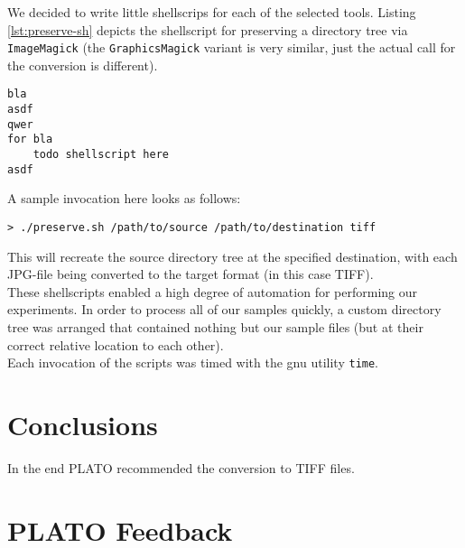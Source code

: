 We decided to write little shellscrips for each of the selected tools. Listing
\ref{lst:preserve-sh} depicts the shellscript for preserving a directory tree
via \texttt{ImageMagick} (the \texttt{GraphicsMagick} variant is very similar,
just the actual call for the conversion is different).

\begin{lstlisting}[caption=Shellscript for preserving a directory tree via
ImageMagick, label=lst:preserve-sh]
bla
asdf
qwer
for bla
    todo shellscript here
asdf
\end{lstlisting}

A sample invocation here looks as follows:

\begin{lstlisting}
> ./preserve.sh /path/to/source /path/to/destination tiff
\end{lstlisting}

This will recreate the source directory tree at the specified destination, with
each JPG-file being converted to the target format (in this case TIFF).\\

These shellscripts enabled a high degree of automation for performing our
experiments. In order to process all of our samples quickly, a custom directory
tree was arranged that contained nothing but our sample files (but at their
correct relative location to each other).\\

Each invocation of the scripts was timed with the gnu utility \texttt{time}.

\section{Conclusions}

In the end PLATO recommended the conversion to TIFF files. 

\section{PLATO Feedback}

